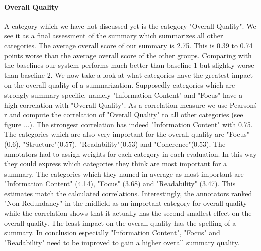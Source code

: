 \paragraph{Overall Quality}
A category which we have not discussed yet is the category "Overall Quality". We see it as a final assessment of the summary which summarizes all other categories. The average overall score of our summary is 2.75. This is 0.39 to 0.74 points worse than the average overall score of the other groups. Comparing with the baselines our system performs much better than baseline 1 but slightly worse than baseline 2. We now take a look at what categories have the greatest impact on the overall quality of a summarization. Supposedly categories which are strongly summary-specific, namely "Information Content" and "Focus" have a high correlation with "Overall Quality". As a correlation measure we use Pearson\'s r and compute the correlation of "Overall Quality" to all other categories (see figure ...). The strongest correlation has indeed "Information Content" with 0.75. The categories which are also very important for the overall quality are "Focus"(0.6), "Structure"(0.57), "Readability"(0.53) and "Coherence"(0.53). The annotators had to assign weights for each category in each evaluation. In this way they could express which categories they think are most important for a summary. The categories which they named in average as most important are "Information Content" (4.14), "Focus" (3.68) and "Readability" (3.47). This estimates match the calculated correlations. Interestingly, the annotators ranked "Non-Redundancy" in the midfield as an important category for overall quality while the correlation shows that it actually has the second-smallest effect on the overall quality. The least impact on the overall quality has the spelling of a summary. In conclusion especially "Information Content", "Focus" and "Readability" need to be improved to gain a higher overall summary quality.